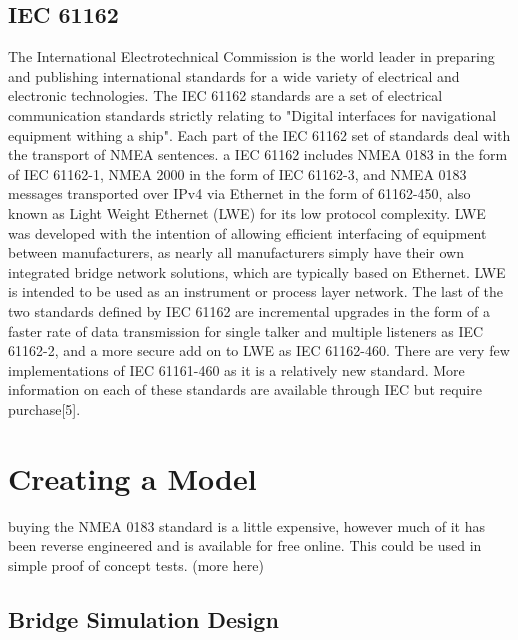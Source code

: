 \documentclass{report}
\begin{document}
\section{IEC 61162}
The International Electrotechnical Commission is the world leader in preparing and publishing international standards for a wide variety of electrical and electronic technologies. The IEC 61162 standards are a set of electrical communication standards strictly relating to "Digital interfaces for navigational equipment withing a ship". Each part of the IEC 61162 set of standards deal with the transport of NMEA sentences. a IEC 61162 includes NMEA 0183 in the form of IEC 61162-1, NMEA 2000 in the form of IEC 61162-3, and NMEA 0183 messages transported over IPv4 via Ethernet in the form of 61162-450, also known as Light Weight Ethernet (LWE) for its low protocol complexity. LWE was developed with the intention of allowing efficient interfacing of equipment between manufacturers, as nearly all manufacturers simply have their own integrated bridge network solutions, which are typically based on Ethernet. LWE is intended to be used as an instrument or process layer network.
\vspace{5mm} %
The last of the two standards defined by IEC 61162 are incremental upgrades in the form of a faster rate of data transmission for single talker and multiple listeners as IEC 61162-2, and a more secure add on to LWE as IEC 61162-460. There are very few implementations of IEC 61161-460 as it is a relatively new standard. More information on each of these standards are available through IEC but require purchase[5].


\chapter{Creating a Model}

buying the NMEA 0183 standard is a little expensive, however much of it has been reverse engineered and is available for free online. This could be used in simple proof of concept tests. (more here)

\section{Bridge Simulation Design}
\end{document}
